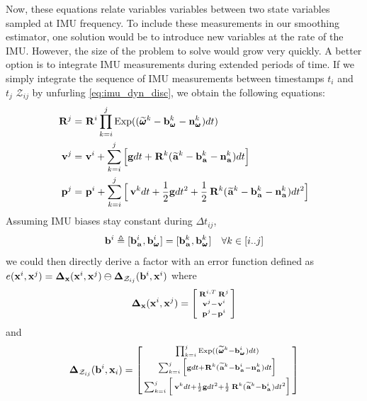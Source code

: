 Now, these equations relate variables variables between two state variables sampled at IMU frequency. To include these measurements in our smoothing estimator,
one solution would be to introduce new variables at the rate of the IMU. However, the size of the problem to solve would grow very quickly. A better option
is to integrate IMU measurements during extended periods of time. If we simply integrate the sequence of IMU measurements between timestamps 
$t_i$ and $t_j$ $\mathcal{Z}_{ij}$ by unfurling \ref{eq:imu_dyn_disc}, we obtain the following equations:
%
\begin{equation}
    \begin{split}
    \prescript{}{}{{\bf R}}_{}^{j}  &= \prescript{}{}{{\bf R}}_{}^{i} \prod_{k=i}^{j} \operatorname*{Exp}((\prescript{}{}{\widetilde{\pmb{\omega}}}_{}^k - {\bf b}_{\prescript{}{}{\pmb{\omega}}_{}}^k - {\bf n}_{\prescript{}{}{\pmb{\omega}}_{}}^k)dt) \\
    \prescript{}{}{{\bf v}}_{}^{j}  &= \prescript{}{}{{\bf v}}_{}^{i} + \sum_{k=i}^{j} \Big[{\bf g} dt + \prescript{}{}{{\bf R}}_{}^{k}(\prescript{}{}{\widetilde{{\bf a}}}_{}^k - {\bf b}_{\prescript{}{}{{\bf a}}_{}}^k - {\bf n}_{\prescript{}{}{{\bf a}}_{}}^k)dt \Big]  \\
    \prescript{}{}{{\bf p}}_{}^{j} &= \prescript{}{}{{\bf p}}_{}^{i} + \sum_{k=i}^{j} \Big[\prescript{}{}{{\bf v}}_{}^{k}dt + \frac{1}{2}{\bf g} dt^2 
    + \frac{1}{2}\prescript{}{}{{\bf R}}_{}^{k}(\prescript{}{}{\widetilde{{\bf a}}}_{}^k - {\bf b}_{\prescript{}{}{{\bf a}}_{}}^k - {\bf n}_{\prescript{}{}{{\bf a}}_{}}^k)dt^2 \Big]
    \end{split}
    \label{eq:IMUIntij}
\end{equation}
%
Assuming IMU biases stay constant during $\Delta t_{ij}$, 
\begin{equation*}
    {\bf b}^i \triangleq [{\bf b}_{\prescript{}{}{{\bf a}}_{}}^i, {\bf b}_{\prescript{}{}{\pmb{\omega}}_{}}^i] = [{\bf b}_{\prescript{}{}{{\bf a}}_{}}^k, {\bf b}_{\prescript{}{}{\pmb{\omega}}_{}}^k]  ~~~ \forall k \in [i..j]
\end{equation*}
we could then directly derive a factor with an error function defined as
$e({\bf x}^i, {\bf x}^j) = {\bm \Delta}_{{\bf x}}({\bf x}^i, {\bf x}^j)  \ominus  {\bm \Delta}_{\mathcal{Z}_{ij}}({\bf b}^i, {\bf x}^i)$
  where 
%
\begin{align}
    {\bm \Delta}_{{\bf x}}({\bf x}^i, {\bf x}^j) = 
    \begin{bsmallmatrix}
    \prescript{}{}{{\bf R}}_{}^{i,T} \prescript{}{}{{\bf R}}_{}^{j}  \\
    \prescript{}{}{{\bf v}}_{}^{j}  - \prescript{}{}{{\bf v}}_{}^{i}  \\
    \prescript{}{}{{\bf p}}_{}^{j} - \prescript{}{}{{\bf p}}_{}^{i}
    \end{bsmallmatrix}
\end{align}
%
and 
%
\begin{align}
    {\bm \Delta}_{\mathcal{Z}_{ij}}({\bf b}^i, {\bf x}_i) = 
    \begin{bsmallmatrix}
    \prod_{k=i}^{j} \operatorname*{Exp}((\prescript{}{}{\widetilde{\pmb{\omega}}}_{}^k - {\bf b}_{\prescript{}{}{\pmb{\omega}}_{}}^i)dt)  \\
    \sum_{k=i}^{j} \Big[{\bf g} dt + \prescript{}{}{{\bf R}}_{}^{k}(\prescript{}{}{\widetilde{{\bf a}}}_{}^k - {\bf b}_{\prescript{}{}{{\bf a}}_{}}^i - {\bf n}_{\prescript{}{}{{\bf a}}_{}}^k)dt \Big]  \\
    \sum_{k=i}^{j} \Big[\prescript{}{}{{\bf v}}_{}^{k}dt + \frac{1}{2}{\bf g} dt^2 
    + \frac{1}{2}\prescript{}{}{{\bf R}}_{}^{k}(\prescript{}{}{\widetilde{{\bf a}}}_{}^k - {\bf b}_{\prescript{}{}{{\bf a}}_{}}^i)dt^2 \Big]
    \end{bsmallmatrix}
\end{align}
